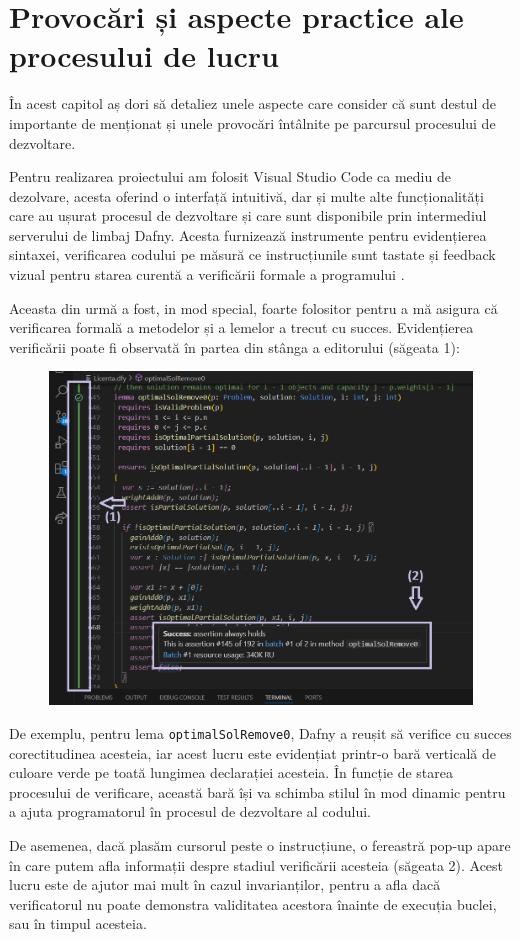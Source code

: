 \chapter{Provocări și aspecte practice ale procesului de lucru}
\begin{sloppypar}

În acest capitol aș dori să detaliez unele aspecte care consider că sunt destul de importante de menționat și unele provocări întâlnite pe parcursul procesului de dezvoltare. \par
Pentru realizarea proiectului am folosit Visual Studio Code ca mediu de dezolvare, acesta oferind o interfață intuitivă, dar și multe alte funcționalități care au ușurat procesul de dezvoltare și care sunt disponibile prin intermediul serverului de limbaj Dafny. Acesta furnizează instrumente pentru evidențierea sintaxei, verificarea codului pe măsură ce instrucțiunile sunt tastate și feedback vizual pentru starea curentă a verificării formale a programului \cite{leino2021dafny}. \par
Aceasta din urmă a fost, in mod special, foarte folositor pentru a mă asigura că verificarea formală a metodelor și a lemelor a trecut cu succes. Evidențierea verificării poate fi observată în partea din stânga a editorului (săgeata 1):
\begin{figure}[!ht]
    \centering
    \includegraphics[width=0.55\linewidth]{images/imageVerificationSucceeded.png}
\end{figure}
\par De exemplu, pentru lema \texttt{optimalSolRemove0}, Dafny a reușit să verifice cu succes corectitudinea acesteia, iar acest lucru este evidențiat printr-o bară verticală de culoare verde pe toată lungimea declarației acesteia. În funcție de starea procesului de verificare, această bară își va schimba stilul în mod dinamic pentru a ajuta programatorul în procesul de dezvoltare al codului.
\par De asemenea, dacă plasăm cursorul peste o instrucțiune, o fereastră pop-up apare în care putem afla informații despre stadiul verificării acesteia (săgeata 2). Acest lucru este de ajutor mai mult în cazul invarianților, pentru a afla dacă verificatorul nu poate demonstra validitatea acestora înainte de execuția buclei, sau în timpul acesteia. \\ \par

\end{sloppypar}
